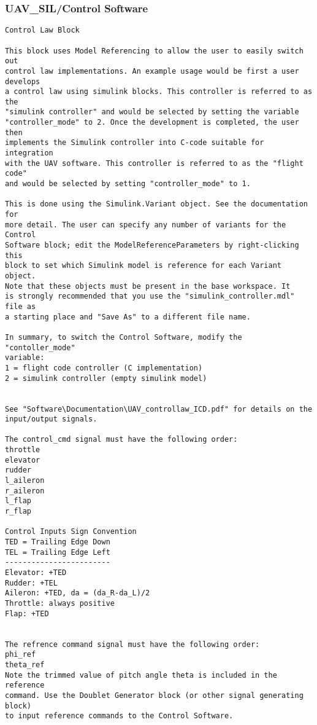 \documentclass[12pt]{article}
\begin{document}
\subsubsection{UAV\_SIL/Control Software}
\begin{verbatim}
Control Law Block

This block uses Model Referencing to allow the user to easily switch out
control law implementations. An example usage would be first a user develops
a control law using simulink blocks. This controller is referred to as the
"simulink controller" and would be selected by setting the variable 
"controller_mode" to 2. Once the development is completed, the user then 
implements the Simulink controller into C-code suitable for integration 
with the UAV software. This controller is referred to as the "flight code"
and would be selected by setting "controller_mode" to 1. 

This is done using the Simulink.Variant object. See the documentation for 
more detail. The user can specify any number of variants for the Control
Software block; edit the ModelReferenceParameters by right-clicking this
block to set which Simulink model is reference for each Variant object. 
Note that these objects must be present in the base workspace. It
is strongly recommended that you use the "simulink_controller.mdl" file as
a starting place and "Save As" to a different file name.

In summary, to switch the Control Software, modify the "contoller_mode" 
variable:
1 = flight code controller (C implementation) 
2 = simulink controller (empty simulink model)


See "Software\Documentation\UAV_controllaw_ICD.pdf" for details on the 
input/output signals.

The control_cmd signal must have the following order:
throttle
elevator
rudder
l_aileron
r_aileron
l_flap
r_flap

Control Inputs Sign Convention
TED = Trailing Edge Down
TEL = Trailing Edge Left
------------------------
Elevator: +TED
Rudder: +TEL
Aileron: +TED, da = (da_R-da_L)/2
Throttle: always positive
Flap: +TED


The refrence command signal must have the following order:
phi_ref
theta_ref
Note the trimmed value of pitch angle theta is included in the reference
command. Use the Doublet Generator block (or other signal generating block)
to input reference commands to the Control Software.


\end{verbatim}
\end{document}
